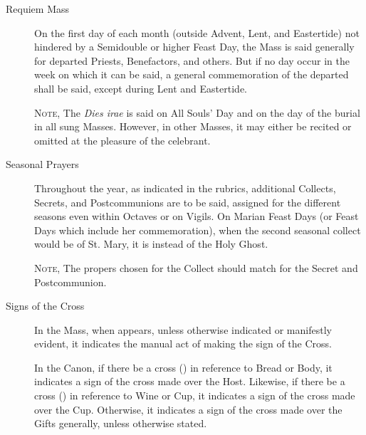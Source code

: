 \begin{description}
    \item[Requiem Mass] On the first day of each month (outside Advent, Lent, and Eastertide) not hindered by a Semidouble or higher Feast Day, the Mass is said generally for departed Priests, Benefactors, and others. But if no day occur in the week on which it can be said, a general commemoration of the departed shall be said, except during Lent and Eastertide.\par
    \textsc{Note,} The \emph{Dies irae} is said on All Souls' Day and on the day of the burial in all sung Masses. However, in other Masses, it may either be recited or omitted at the pleasure of the celebrant.
    \item[Seasonal Prayers] Throughout the year, as indicated in the rubrics, additional Collects, Secrets, and Postcommunions are to be said, assigned for the different seasons even within Octaves or on Vigils. On Marian Feast Days (or Feast Days which include her commemoration), when the second seasonal collect would be of St. Mary, it is instead of the Holy Ghost.\par
    \textsc{Note,} The propers chosen for the Collect should match for the Secret and Postcommunion.
    \item[Signs of the Cross] In the Mass, when {} appears, unless otherwise indicated or manifestly evident, it indicates the manual act of making the sign of the Cross.\par
    In the Canon, if there be a cross ({}) in reference to Bread or Body, it indicates a sign of the cross made over the Host. Likewise, if there be a cross ({}) in reference to Wine or Cup, it indicates a sign of the cross made over the Cup. Otherwise, it indicates a sign of the cross made over the Gifts generally, unless otherwise stated.\par

\end{description}
